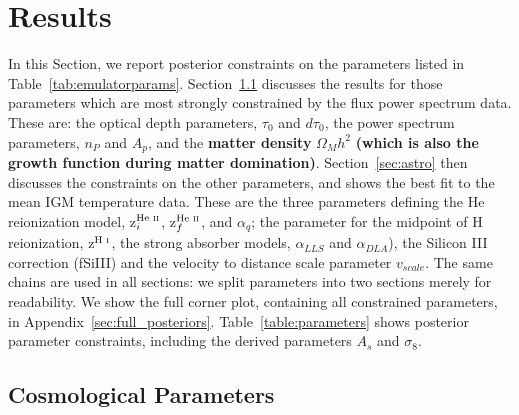 \section{Results}\label{sec:results}

In this Section, we report posterior constraints on the parameters listed in Table~\ref{tab:emulatorparams}.
Section~\ref{sec:cosmo} discusses the results for those parameters which are most strongly constrained by the flux power spectrum data.
These are: the optical depth parameters, $\tau_0$ and $d\tau_0$, the power spectrum parameters, $n_P$ and $A_p$, and the \textbf{matter density} $\Omega_M h^2$ \textbf{(which is also the growth function during matter domination)}.
Section~\ref{sec:astro} then discusses the constraints on the other parameters, and shows the best fit to the mean IGM temperature data.
These are the three parameters defining the He~{} reionization model, z$^{\text{He~{\sc ii}}}_i$, z$^{\text{He~{\sc ii}}}_f$, and $\alpha_q$; the parameter for the midpoint of H~{} reionization, z$^{\text{H~{\sc i}}}$, the strong absorber models, $\alpha_{LLS}$ and $\alpha_{DLA}$), the Silicon III correction (fSiIII) and the velocity to distance scale parameter $v_{scale}$.
The same chains are used in all sections: we split parameters into two sections merely for readability.
We show the full corner plot, containing all constrained parameters, in Appendix~\ref{sec:full_posteriors}.
Table~\ref{table:parameters} shows posterior parameter constraints, including the derived parameters $A_s$ and $\sigma_8$. 


\subsection{Cosmological Parameters}\label{sec:cosmo}

